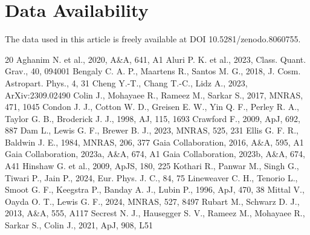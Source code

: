 \documentclass[fleqn,usenatbib]{mnras}
\begin{document}
\section*{Data Availability}
The data used in this article is freely available at DOI 10.5281/zenodo.8060755. 
\begin{thebibliography}{20}
 Aghanim N. et al., 2020, A\&A, 641, A1
 Aluri P. K. et al., 2023, Class. Quant. Grav., 40, 094001 
 Bengaly C. A. P., Maartens R., Santos M. G., 2018, J. Cosm. Astropart. Phys., 4, 31
 Cheng Y.-T., Chang T.-C., Lidz A., 2023, ArXiv:2309.02490
\bibitem{} Colin J., Mohayaee R., Rameez M., Sarkar S., 2017, MNRAS, 471, 1045
 Condon J. J., Cotton W. D., Greisen E. W., Yin Q. F., Perley R. A., Taylor G. B., Broderick J. J., 1998, AJ, 115, 1693
 Crawford F., 2009, ApJ, 692, 887
 Dam L., Lewis G. F., Brewer B. J., 2023, MNRAS, 525, 231 
 Ellis G. F. R., Baldwin  J. E., 1984, MNRAS, 206, 377 
 Gaia Collaboration, 2016, A\&A, 595, A1
 Gaia Collaboration, 2023a, A\&A, 674, A1
 Gaia Collaboration, 2023b, A\&A, 674, A41
 Hinshaw G. et al., 2009, ApJS, 180, 225
 Kothari R., Panwar M., Singh G., Tiwari P., Jain P., 2024, Eur. Phys. J. C.,
84, 75
 Lineweaver C. H., Tenorio L., Smoot G. F., Keegstra P., Banday A. J., Lubin P., 1996, ApJ, 470, 38
 Mittal V., Oayda O. T., Lewis G. F., 2024, MNRAS, 527, 8497
 Rubart M., Schwarz D. J., 2013, A\&A, 555, A117
 Secrest N. J., Hausegger S. V., Rameez M., Mohayaee R., Sarkar S., Colin J., 2021,  ApJ, 908, L51 

\end{thebibliography}
\end{document}
